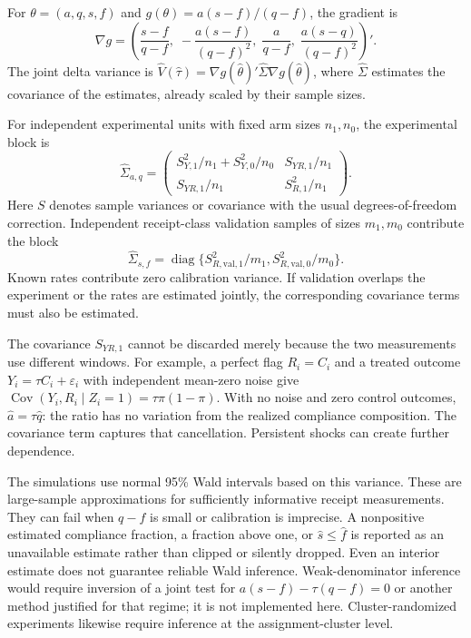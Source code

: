 \documentclass[11pt]{article}
\begin{document}
For $\theta=(a,q,s,f)$ and $g(\theta)=a(s-f)/(q-f)$, the gradient is
\begin{equation}\label{eq:gradient}
\nabla g=\left(
\frac{s-f}{q-f},\;
-\frac{a(s-f)}{(q-f)^2},\;
\frac{a}{q-f},\;
\frac{a(s-q)}{(q-f)^2}
\right)' .
\end{equation}
The joint delta variance is $\widehat V(\hat\tau)=\nabla g(\hat\theta)'\widehat\Sigma\nabla g(\hat\theta)$, where $\widehat\Sigma$ estimates the covariance of the estimates, already scaled by their sample sizes.

For independent experimental units with fixed arm sizes $n_1,n_0$, the experimental block is
\begin{equation}\label{eq:covariance}
\widehat\Sigma_{a,q}=
\begin{pmatrix}
S^2_{Y,1}/n_1+S^2_{Y,0}/n_0 & S_{YR,1}/n_1\\
S_{YR,1}/n_1 & S^2_{R,1}/n_1
\end{pmatrix}.
\end{equation}
Here $S$ denotes sample variances or covariance with the usual degrees-of-freedom correction. Independent receipt-class validation samples of sizes $m_1,m_0$ contribute the block
\[
\widehat\Sigma_{s,f}=\operatorname{diag}\{S^2_{R,\mathrm{val},1}/m_1,S^2_{R,\mathrm{val},0}/m_0\}.
\]
Known rates contribute zero calibration variance. If validation overlaps the experiment or the rates are estimated jointly, the corresponding covariance terms must also be estimated.

The covariance $S_{YR,1}$ cannot be discarded merely because the two measurements use different windows. For example, a perfect flag $R_i=C_i$ and a treated outcome $Y_i=\tau C_i+\varepsilon_i$ with independent mean-zero noise give
$\operatorname{Cov}(Y_i,R_i\mid Z_i=1)=\tau\pi(1-\pi)$.
With no noise and zero control outcomes, $\hat a=\tau\hat q$: the ratio has no variation from the realized compliance composition. The covariance term captures that cancellation. Persistent shocks can create further dependence.

The simulations use normal 95\% Wald intervals based on this variance. These are large-sample approximations for sufficiently informative receipt measurements. They can fail when $q-f$ is small or calibration is imprecise. A nonpositive estimated compliance fraction, a fraction above one, or $\hat s\leq\hat f$ is reported as an unavailable estimate rather than clipped or silently dropped. Even an interior estimate does not guarantee reliable Wald inference. Weak-denominator inference would require inversion of a joint test for $a(s-f)-\tau(q-f)=0$ or another method justified for that regime; it is not implemented here. Cluster-randomized experiments likewise require inference at the assignment-cluster level.
\end{document}
